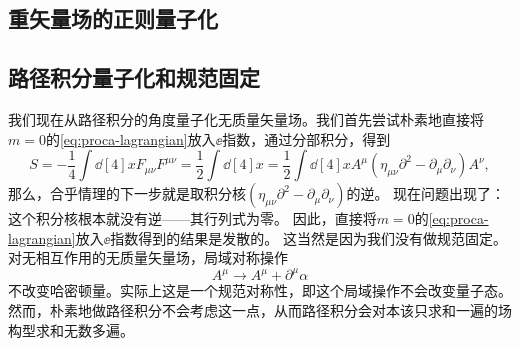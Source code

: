 \subsection{重矢量场的正则量子化}

\subsection{路径积分量子化和规范固定}

我们现在从路径积分的角度量子化无质量矢量场。我们首先尝试朴素地直接将$m=0$的\eqref{eq:proca-lagrangian}放入$\ee$指数，通过分部积分，得到
\begin{equation}
    S = - \frac{1}{4} \int \dd[4]{x} F_{\mu \nu} F^{\mu \nu} = \frac{1}{2} \int \dd[4]{x} = \frac{1}{2} \int \dd[4]{x} A^\mu (\eta_{\mu \nu} \partial^2 - \partial_\mu \partial_\nu) A^\nu,
\end{equation}
那么，合乎情理的下一步就是取积分核$(\eta_{\mu \nu} \partial^2 - \partial_\mu \partial_\nu)$的逆。
现在问题出现了：这个积分核根本就没有逆——其行列式为零。
因此，直接将$m=0$的\eqref{eq:proca-lagrangian}放入$\ee$指数得到的结果是发散的。
这当然是因为我们没有做规范固定。对无相互作用的无质量矢量场，局域对称操作
\[
    A^\mu \longrightarrow A^\mu + \partial^\mu \alpha
\]
不改变哈密顿量。实际上这是一个规范对称性，即这个局域操作不会改变量子态。然而，朴素地做路径积分不会考虑这一点，从而路径积分会对本该只求和一遍的场构型求和无数多遍。

